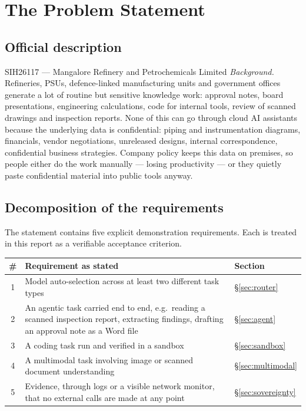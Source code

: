 \section{The Problem Statement}

\subsection{Official description}

\begin{keybox}{SIH26117 --- Mangalore Refinery and Petrochemicals Limited}
\emph{Background.} Refineries, PSUs, defence-linked manufacturing units and
government offices generate a lot of routine but sensitive knowledge work:
approval notes, board presentations, engineering calculations, code for
internal tools, review of scanned drawings and inspection reports. None of this
can go through cloud AI assistants because the underlying data is confidential:
piping and instrumentation diagrams, financials, vendor negotiations,
unreleased designs, internal correspondence, confidential business strategies.
Company policy keeps this data on premises, so people either do the work
manually --- losing productivity --- or they quietly paste confidential
material into public tools anyway.
\end{keybox}

\subsection{Decomposition of the requirements}

The statement contains five explicit demonstration requirements. Each is
treated in this report as a verifiable acceptance criterion.

\begin{center}
\renewcommand{\arraystretch}{1.3}
\begin{tabularx}{\linewidth}{@{}c X l@{}}
\toprule
\textbf{\#} & \textbf{Requirement as stated} & \textbf{Section} \\
\midrule
1 & Model auto-selection across at least two different task types &
    \S\ref{sec:router} \\
2 & An agentic task carried end to end, e.g.\ reading a scanned inspection
    report, extracting findings, drafting an approval note as a Word file &
    \S\ref{sec:agent} \\
3 & A coding task run and verified in a sandbox & \S\ref{sec:sandbox} \\
4 & A multimodal task involving image or scanned document understanding &
    \S\ref{sec:multimodal} \\
5 & Evidence, through logs or a visible network monitor, that no external calls
    are made at any point & \S\ref{sec:sovereignty} \\
\bottomrule
\end{tabularx}
\end{center}

